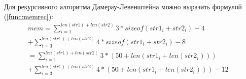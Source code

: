 \documentclass[a4paper,12pt]{report}
\begin{document}
\begin{center}
\begin{flushleft}
    		Для рекурсивного алгоритма Дамерау-Левенштейна можно выразить формулой (\ref{func:memrec}):\\
    		\begin{multline}
    			\label{func:memrec}
    			mem = \sum\limits_{i=1}^{len(str1)+len(str2)} 3*sizeof(str1_{i} + str2_{i}) - 4  \\+ \sum\limits_{i=3}^{len(str1)+len(str2)} 4*sizeof(str1_{i} + str2_{i}) - 8\\
    			= \sum\limits_{i=1}^{len(str1)+len(str2)} 3*(50 + len(str1_{i} + len(str2_{i}))) \\+ \sum\limits_{i=3}^{len(str1)+len(str2)} 4*(50 + len(str1_{i} + len(str2_{i})))-12
    		\end{multline}
    	\end{flushleft}
    \end{center}

    \newpage
\end{document}
